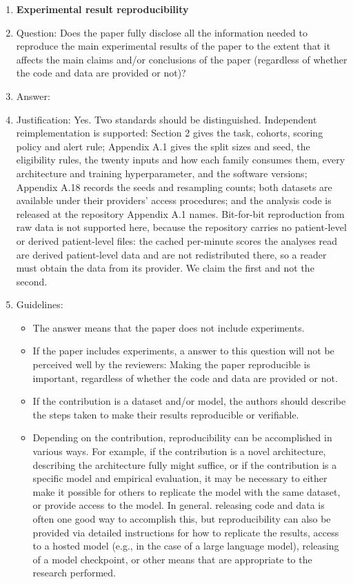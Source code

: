 \begin{enumerate}
    \item {\bf Experimental result reproducibility}
    \item[] Question: Does the paper fully disclose all the information needed to reproduce the main experimental results of the paper to the extent that it affects the main claims and/or conclusions of the paper (regardless of whether the code and data are provided or not)?
    \item[] Answer: \answerYes{}
    \item[] Justification: Yes. Two standards should be distinguished. Independent reimplementation is supported: Section 2 gives the task, cohorts, scoring policy and alert rule; Appendix A.1 gives the split sizes and seed, the eligibility rules, the twenty inputs and how each family consumes them, every architecture and training hyperparameter, and the software versions; Appendix A.18 records the seeds and resampling counts; both datasets are available under their providers' access procedures; and the analysis code is released at the repository Appendix A.1 names. Bit-for-bit reproduction from raw data is not supported here, because the repository carries no patient-level or derived patient-level files: the cached per-minute scores the analyses read are derived patient-level data and are not redistributed there, so a reader must obtain the data from its provider. We claim the first and not the second.
    \item[] Guidelines:
    \begin{itemize}
        \item The answer \answerNA{} means that the paper does not include experiments.
        \item If the paper includes experiments, a \answerNo{} answer to this question will not be perceived well by the reviewers: Making the paper reproducible is important, regardless of whether the code and data are provided or not.
        \item If the contribution is a dataset and\slash or model, the authors should describe the steps taken to make their results reproducible or verifiable. 
        \item Depending on the contribution, reproducibility can be accomplished in various ways. For example, if the contribution is a novel architecture, describing the architecture fully might suffice, or if the contribution is a specific model and empirical evaluation, it may be necessary to either make it possible for others to replicate the model with the same dataset, or provide access to the model. In general. releasing code and data is often one good way to accomplish this, but reproducibility can also be provided via detailed instructions for how to replicate the results, access to a hosted model (e.g., in the case of a large language model), releasing of a model checkpoint, or other means that are appropriate to the research performed.

\end{itemize}
\end{enumerate}

